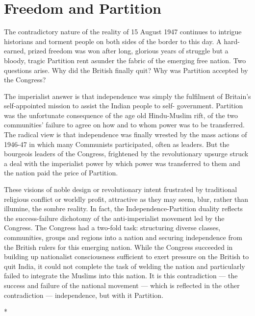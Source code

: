 \chapter{Freedom and Partition}



The contradictory nature of the reality of 15 August 1947 continues to intrigue historians and torment people on both sides of the border to this day. A hard-earned, prized freedom was won after long, glorious years of struggle but a bloody, tragic Partition rent asunder the fabric of the emerging free nation. Two questions arise. Why did the British finally quit? Why was Partition accepted by the Congress? 

The imperialist answer is that independence was simply the fulfilment of Britain's self-appointed mission to assist the Indian people to self- government. Partition was the unfortunate consequence of the age old Hindu-Muslim rift, of the two communities' failure to agree on how and to whom power was to be transferred. The radical view is that independence was finally wrested by the mass actions of 1946-47 in which many Communists participated, often as leaders. But the bourgeois leaders of the Congress, frightened by the revolutionary upsurge struck a deal with the imperialist power by which power was transferred to them and the nation paid the price of Partition. 

These visions of noble design or revolutionary intent frustrated by traditional religious conflict or worldly profit, attractive as they may seem, blur, rather than illumine, the sombre reality. In fact, the Independence-Partition duality reflects the success-failure dichotomy of the anti-imperialist movement led by the Congress. The Congress had a two-fold task: structuring diverse classes, communities, groups and regions into a nation and securing independence from the British rulers for this emerging nation. While the Congress succeeded in building up nationalist consciousness sufficient to exert pressure on the British to quit India, it could not complete the task of welding the nation and particularly failed to integrate the Muslims into this nation. It is this contradiction — the success and failure of the national movement — which is reflected in the other contradiction — independence, but with it Partition.

\begin{center}*\end{center}

\paragraph*{}


